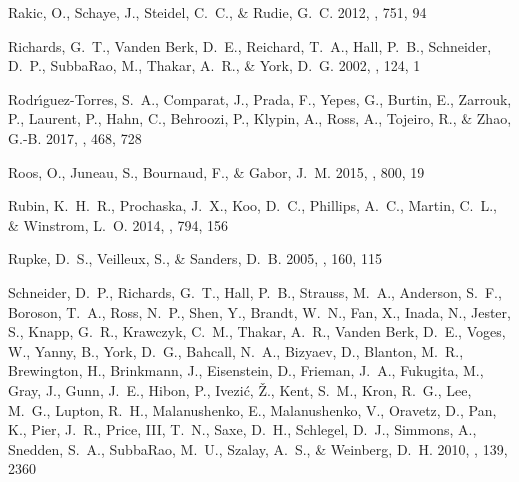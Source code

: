 \documentclass[iop]{emulateapj}
\begin{document}
\begin{thebibliography}{46}
{Rakic}, O., {Schaye}, J., {Steidel}, C.~C., \& {Rudie}, G.~C. 2012, \apj, 751,
  94

{Richards}, G.~T., {Vanden Berk}, D.~E., {Reichard}, T.~A., {Hall}, P.~B.,
  {Schneider}, D.~P., {SubbaRao}, M., {Thakar}, A.~R., \& {York}, D.~G. 2002,
  \aj, 124, 1

{Rodr{\'{\i}}guez-Torres}, S.~A., {Comparat}, J., {Prada}, F., {Yepes}, G.,
  {Burtin}, E., {Zarrouk}, P., {Laurent}, P., {Hahn}, C., {Behroozi}, P.,
  {Klypin}, A., {Ross}, A., {Tojeiro}, R., \& {Zhao}, G.-B. 2017, \mnras, 468,
  728

{Roos}, O., {Juneau}, S., {Bournaud}, F., \& {Gabor}, J.~M. 2015, \apj, 800, 19

{Rubin}, K.~H.~R., {Prochaska}, J.~X., {Koo}, D.~C., {Phillips}, A.~C.,
  {Martin}, C.~L., \& {Winstrom}, L.~O. 2014, \apj, 794, 156

{Rupke}, D.~S., {Veilleux}, S., \& {Sanders}, D.~B. 2005, \apjs, 160, 115

{Schneider}, D.~P., {Richards}, G.~T., {Hall}, P.~B., {Strauss}, M.~A.,
  {Anderson}, S.~F., {Boroson}, T.~A., {Ross}, N.~P., {Shen}, Y., {Brandt},
  W.~N., {Fan}, X., {Inada}, N., {Jester}, S., {Knapp}, G.~R., {Krawczyk},
  C.~M., {Thakar}, A.~R., {Vanden Berk}, D.~E., {Voges}, W., {Yanny}, B.,
  {York}, D.~G., {Bahcall}, N.~A., {Bizyaev}, D., {Blanton}, M.~R.,
  {Brewington}, H., {Brinkmann}, J., {Eisenstein}, D., {Frieman}, J.~A.,
  {Fukugita}, M., {Gray}, J., {Gunn}, J.~E., {Hibon}, P., {Ivezi{\'c}}, {\v
  Z}., {Kent}, S.~M., {Kron}, R.~G., {Lee}, M.~G., {Lupton}, R.~H.,
  {Malanushenko}, E., {Malanushenko}, V., {Oravetz}, D., {Pan}, K., {Pier},
  J.~R., {Price}, III, T.~N., {Saxe}, D.~H., {Schlegel}, D.~J., {Simmons}, A.,
  {Snedden}, S.~A., {SubbaRao}, M.~U., {Szalay}, A.~S., \& {Weinberg}, D.~H.
  2010, \aj, 139, 2360


\end{thebibliography}
\end{document}
